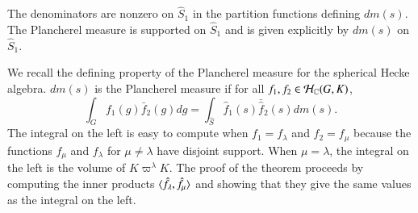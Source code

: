 \begin{theorem}
The denominators are nonzero on $\hat S_1$ in the partition functions defining 
$dm(s)$. 
The Plancherel measure is supported on $\hat S_1$ and is given explicitly by $dm(s)$ on $\hat S_1$.
\end{theorem}

We recall the defining property of the Plancherel measure
for the spherical Hecke algebra.  $dm(s)$ is the Plancherel measure if
for all $f_1,f_2\in \mathcal H_{\mathbb{C}}(G,K)$,
\[
\int_G f_1(g) \bar f_2 (g) dg = \int_{\hat S} \hat f_1(s) \bar {\hat f}_2 (s) dm(s).
\]
The integral on the left is easy to compute when $f_1 = f_\lambda$ and $f_2 = f_\mu$
because the functions $f_\mu$ and $f_\lambda$ for $\mu\ne\lambda$ have disjoint support.
When $\mu=\lambda$, the integral on the left is the volume of $K\varpi^\lambda K$.
The proof of the theorem proceeds by computing the inner products $\langle{\hat f_\lambda,\hat f_\mu}\rangle$
and showing that they give the same values as the integral on the left.


